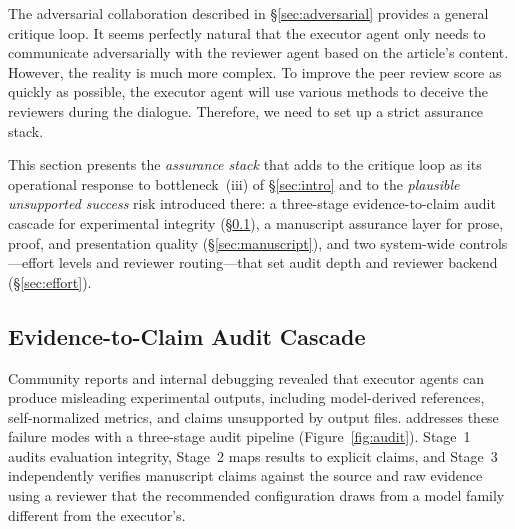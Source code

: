 The adversarial collaboration described in \S\ref{sec:adversarial} provides a general critique loop.
It seems perfectly natural that the executor agent only needs to communicate adversarially with the reviewer agent based on the article's content. However, the reality is much more complex. To improve the peer review score as quickly as possible, the executor agent will use various methods to deceive the reviewers during the dialogue. Therefore, we need to set up a strict assurance stack.

This section presents the \emph{assurance stack} that \aris{} adds to the critique loop as its operational response to bottleneck~(iii) of \S\ref{sec:intro} and to the \emph{plausible unsupported success} risk introduced there: a three-stage evidence-to-claim audit cascade for experimental integrity (\S\ref{sec:audit}), a manuscript assurance layer for prose, proof, and presentation quality (\S\ref{sec:manuscript}), and two system-wide controls---effort levels and reviewer routing---that set audit depth and reviewer backend (\S\ref{sec:effort}).

\subsection{Evidence-to-Claim Audit Cascade}
\label{sec:audit}

Community reports and internal debugging revealed that executor agents can produce misleading experimental outputs, including model-derived references, self-normalized metrics, and claims unsupported by output files.
\aris{} addresses these failure modes with a three-stage audit pipeline (Figure~\ref{fig:audit}).
Stage~1 audits evaluation integrity, Stage~2 maps results to explicit claims, and Stage~3 independently verifies manuscript claims against the source and raw evidence using a reviewer that the recommended configuration draws from a model family different from the executor's.



